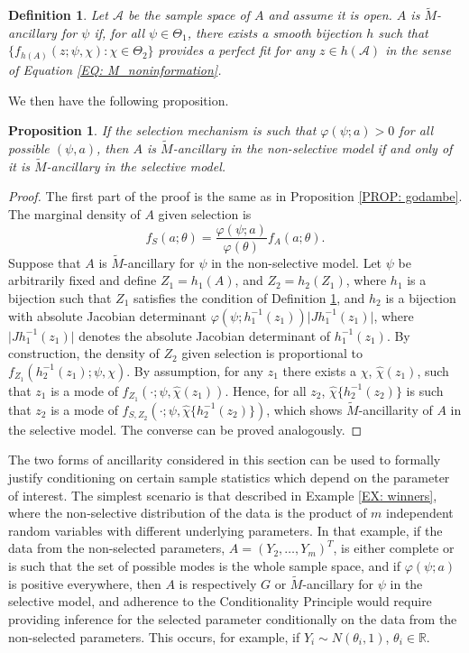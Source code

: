 \documentclass[pdflatex,sn-chicago]{sn-jnl}%
\theoremstyle{thmstyleone}%
\newtheorem{proposition}[theorem]{Proposition}%
\theoremstyle{thmstyletwo}%
\theoremstyle{thmstylethree}%
\newtheorem{definition}{Definition}%
\begin{document}
\begin{definition} \label{DEF: tilde_M}
Let $\mathcal{A}$ be the sample space of $A$ and assume it is open. $A$ is $\tilde M$-ancillary for $\psi$ if, for all $\psi\in \Theta_1$, there exists a smooth bijection $h$ such that $\{f_{h(A)}(z; \psi, \chi) \colon \chi \in \Theta_2\}$ provides a perfect fit for any $z\in h(\mathcal{A})$ in the sense of Equation \eqref{EQ: M_noninformation}.
\end{definition}

We then have the following proposition.
\begin{proposition}
If the selection mechanism is such that $\varphi(\psi; a) > 0$ for all possible $(\psi, a)$, then $A$ is $\tilde M$-ancillary in the non-selective model if and only of it is $\tilde M$-ancillary in the selective model. 
\end{proposition}

\begin{proof}
The first part of the proof is the same as in Proposition \ref{PROP: godambe}. The marginal density of $A$ given selection is
\begin{equation*}
f_{S}(a;\theta) = \frac{\varphi(\psi;a)}{\varphi(\theta)} f_A(a;\theta).
\end{equation*}
Suppose that $A$ is $\tilde M$-ancillary for $\psi$ in the non-selective model. Let $\psi$ be arbitrarily fixed and define $Z_1 = h_1(A)$, and $Z_2 = h_2(Z_1)$, where $h_1 $ is a bijection such that $Z_1$ satisfies the condition of Definition \ref{DEF: tilde_M}, and $h_2$ is a bijection with absolute Jacobian determinant $\varphi(\psi;h_1^{-1}(z_1))\vert Jh_1^{-1}(z_1) \vert$, where $\vert J h_1^{-1}(z_1) \vert$ denotes the absolute Jacobian determinant of $h_1^{-1}(z_1)$. By construction, the density of $Z_2$ given selection is proportional to $f_{Z_1}(h_2^{-1}(z_1); \psi, \chi)$. By assumption, for any $z_1$ there exists a $\chi$, $\hat\chi(z_1)$, such that $z_1$ is a mode of $f_{Z_1}(\cdot; \psi, \hat\chi(z_1))$. Hence, for all $z_2$, $\hat\chi\{h_2^{-1}(z_2)\}$ is such that $z_2$ is a mode of $f_{S, Z_2}(\cdot; \psi, \hat\chi\{h_2^{-1}(z_2)\})$, which shows $\tilde M$-ancillarity of $A$ in the selective model. 
The converse can be proved analogously.
\end{proof}

The two forms of ancillarity considered in this section can be used to formally justify conditioning on certain sample statistics which depend on the parameter of interest. The simplest scenario is that described in Example \ref{EX: winners}, where the non-selective distribution of the data is the product of $m$ independent random variables with different underlying parameters. In that example, if the data from the non-selected parameters, $A = (Y_2, \ldots, Y_m)^T$, is either complete or is such that the set of possible modes is the whole sample space, and if $\varphi(\psi; a)$ is positive everywhere, then $A$ is respectively $G$ or $\tilde M$-ancillary for $\psi$ in the selective model, and adherence to the Conditionality Principle would require providing inference for the selected parameter conditionally on the data from the non-selected parameters.
This occurs, for example, if $Y_i\sim N(\theta_i, 1)$, $\theta_i \in \mathbb{R}$. 
\end{document}
